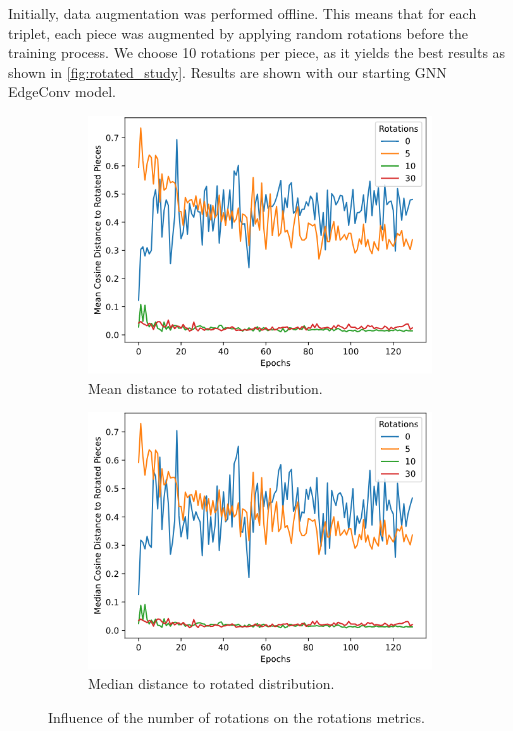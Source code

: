 Initially, data augmentation was performed offline. This means that for each triplet, each piece was augmented by applying random rotations before the training process. We choose 10 rotations per piece, as it yields the best results as shown in \autoref{fig:rotated_study}. Results are shown with our starting GNN EdgeConv model.
\begin{figure}[]
    \begin{subfigure}[h]{0.5\linewidth}
        \includegraphics[width=\columnwidth]{images/mean_rotated_study.png}
        \caption{Mean distance to rotated distribution.}
        \label{fig:mean_rotated_study}
    \end{subfigure}
    \hfill
    \begin{subfigure}[h]{0.5\linewidth}
        \includegraphics[width=\columnwidth]{images/median_rotated_study.png}
        \caption{Median distance to rotated distribution.}
        \label{fig:median_rotated_study}
    \end{subfigure}
    \caption{Influence of the number of rotations on the rotations metrics.}
    \label{fig:rotated_study}
\end{figure}

